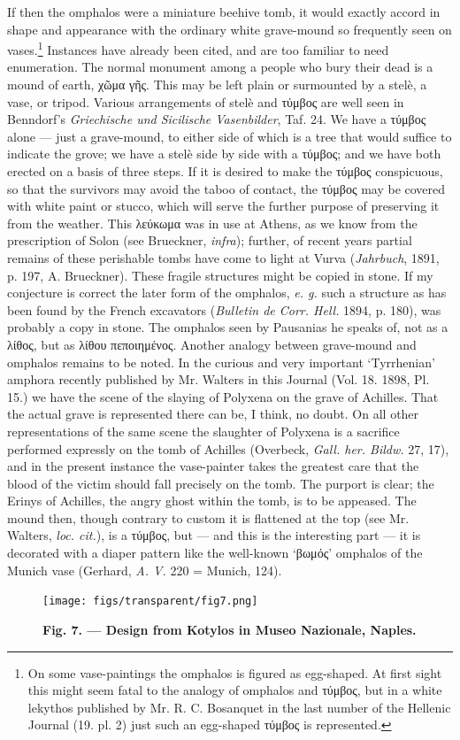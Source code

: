 \documentclass[a4paper, 11pt, oneside, polutonikogreek, english]{article}
\begin{document}
If then the omphalos were a miniature beehive tomb, it would exactly accord in shape and appearance with the ordinary white grave-mound so frequently seen on vases.\footnote{On some vase-paintings the omphalos is figured as egg-shaped. At first sight this might seem fatal to the analogy of omphalos and τύμβος, but in a white lekythos published by Mr. R. C. Bosanquet in the last number of the Hellenic Journal (19. pl. 2) just such an egg-shaped τύμβος is represented.} Instances have already been cited, and are too familiar to need enumeration. The normal monument among a people who bury their dead is a mound of earth, χῶμα γῆς. This may be left plain or surmounted by a stelè, a vase, or tripod. Various arrangements of stelè and τύμβος are well seen in Benndorf's \emph{Griechische und Sicilische Vasenbilder}, Taf. 24. We have a τύμβος alone --- just a grave-mound, to either side of which is a tree that would suffice to indicate the grove; we have a stelè side by side with a τύμβος; and we have both erected on a basis of three steps. If it is desired to make the τύμβος conspicuous, so that the survivors may avoid the taboo of contact, the τύμβος may be covered with white paint or stucco, which will serve the further purpose of preserving it from the weather. This λεύκωμα was in use at Athens, as we know from the prescription of Solon (see Brueckner, \emph{infra}); further, of recent years partial remains of these perishable tombs have come to light at Vurva (\emph{Jahrbuch}, 1891, p. 197, A. Brueckner). These fragile structures might be copied in stone. If my conjecture is correct the later form of the omphalos, \emph{e. g.} such a structure as has been found by the French excavators (\emph{Bulletin de Corr. Hell.} 1894, p. 180), was probably a copy in stone. The omphalos seen by Pausanias he speaks of, not as a λίθος, but as λίθου πεποιημένος. Another analogy between grave-mound and omphalos remains to be noted. In the curious and very important `Tyrrhenian' amphora recently published by Mr. Walters in this Journal (Vol. 18. 1898, Pl. 15.) we have the scene of the slaying of Polyxena on the grave of Achilles. That the actual grave is represented there can be, I think, no doubt. On all other representations of the same scene the slaughter of Polyxena is a sacrifice performed expressly on the tomb of Achilles (Overbeck, \emph{Gall. her. Bildw.} 27, 17), and in the present instance the vase-painter takes the greatest care that the blood of the victim should fall precisely on the tomb. The purport is clear; the Erinys of Achilles, the angry ghost within the tomb, is to be appeased. The mound then, though contrary to custom it is flattened at the top (see Mr. Walters, \emph{loc. cit.}), is a τύμβος, but --- and this is the interesting part --- it is decorated with a diaper pattern like the well-known `βωμός' omphalos of the Munich vase (Gerhard, \emph{A. V.} 220 = Munich, 124).
\begin{figure}[H]
\centering
\texttt{[image: figs/transparent/fig7.png]}
\caption{\bfseries Fig. 7. --- Design from Kotylos in Museo Nazionale, Naples.}
\end{figure}
\end{document}
